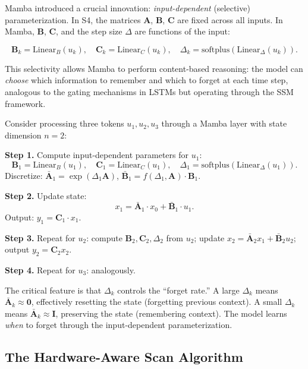 Mamba \citep{gu2023mamba} introduced a crucial innovation: \emph{input-dependent} (selective) parameterization. In S4, the matrices $\mathbf{A}$, $\mathbf{B}$, $\mathbf{C}$ are fixed across all inputs. In Mamba, $\mathbf{B}$, $\mathbf{C}$, and the step size $\Delta$ are functions of the input:

\begin{equation}
\mathbf{B}_k = \text{Linear}_B(u_k), \quad \mathbf{C}_k = \text{Linear}_C(u_k), \quad \Delta_k = \text{softplus}\!\left(\text{Linear}_\Delta(u_k)\right).
\label{eq:mamba-selective}
\end{equation}

This selectivity allows Mamba to perform content-based reasoning: the model can \emph{choose} which information to remember and which to forget at each time step, analogous to the gating mechanisms in LSTMs but operating through the SSM framework.

\begin{example}
Consider processing three tokens $u_1, u_2, u_3$ through a Mamba layer with state dimension $n = 2$:

\textbf{Step 1.} Compute input-dependent parameters for $u_1$:
\[
\mathbf{B}_1 = \text{Linear}_B(u_1), \quad \mathbf{C}_1 = \text{Linear}_C(u_1), \quad \Delta_1 = \text{softplus}(\text{Linear}_\Delta(u_1)).
\]
Discretize: $\bar{\mathbf{A}}_1 = \exp(\Delta_1 \mathbf{A})$, $\bar{\mathbf{B}}_1 = f(\Delta_1, \mathbf{A}) \cdot \mathbf{B}_1$.

\textbf{Step 2.} Update state:
\[
x_1 = \bar{\mathbf{A}}_1 \cdot x_0 + \bar{\mathbf{B}}_1 \cdot u_1.
\]
Output: $y_1 = \mathbf{C}_1 \cdot x_1$.

\textbf{Step 3.} Repeat for $u_2$: compute $\mathbf{B}_2, \mathbf{C}_2, \Delta_2$ from $u_2$; update $x_2 = \bar{\mathbf{A}}_2 x_1 + \bar{\mathbf{B}}_2 u_2$; output $y_2 = \mathbf{C}_2 x_2$.

\textbf{Step 4.} Repeat for $u_3$: analogously.

The critical feature is that $\Delta_k$ controls the ``forget rate.'' A large $\Delta_k$ means $\bar{\mathbf{A}}_k \approx \mathbf{0}$, effectively resetting the state (forgetting previous context). A small $\Delta_k$ means $\bar{\mathbf{A}}_k \approx \mathbf{I}$, preserving the state (remembering context). The model learns \emph{when} to forget through the input-dependent parameterization.
\end{example}

\subsection{The Hardware-Aware Scan Algorithm}

